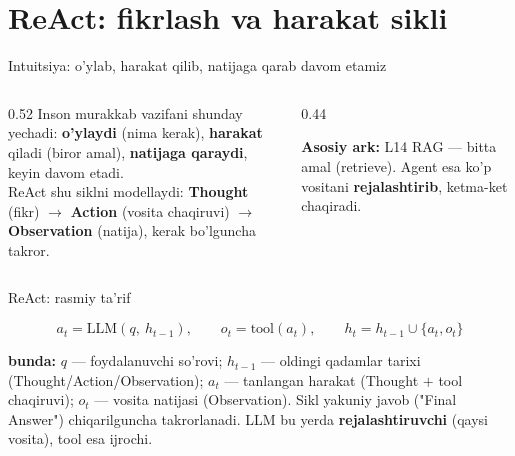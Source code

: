 \documentclass[aspectratio=169,11pt]{beamer}
\newcommand{\bunda}[1]{{\small\textbf{bunda:}\; #1}}
\begin{document}
\section[ReAct]{ReAct: fikrlash va harakat sikli}

\begin{frame}{Intuitsiya: o'ylab, harakat qilib, natijaga qarab davom etamiz}
  \begin{columns}[T]
    \begin{column}{0.52\textwidth}
      \small
      Inson murakkab vazifani shunday yechadi: \textbf{o'ylaydi} (nima kerak),
      \textbf{harakat} qiladi (biror amal), \textbf{natijaga qaraydi}, keyin
      davom etadi.\\[5pt]
      ReAct shu siklni modellaydi: \textbf{Thought} (fikr) $\to$ \textbf{Action}
      (vosita chaqiruvi) $\to$ \textbf{Observation} (natija), kerak bo'lguncha
      takror.
    \end{column}
    \begin{column}{0.44\textwidth}
      \begin{tcolorbox}[okbox,top=2pt,bottom=2pt]
        \footnotesize
        \textbf{Asosiy ark:} L14 RAG --- bitta amal (retrieve). Agent esa
        ko'p vositani \textbf{rejalashtirib}, ketma-ket chaqiradi.
      \end{tcolorbox}
    \end{column}
  \end{columns}
\end{frame}

\begin{frame}{ReAct: rasmiy ta'rif}
  \begin{tcolorbox}[defbox,title={Ta'rif: Reasoning + Acting sikli}]
    \vspace{-0.4em}
    $$ a_t = \mathrm{LLM}(q,\ h_{t-1}), \qquad
       o_t = \mathrm{tool}(a_t), \qquad
       h_t = h_{t-1} \cup \{a_t, o_t\} $$
  \end{tcolorbox}
  \vspace{2pt}
  \bunda{$q$ --- foydalanuvchi so'rovi; $h_{t-1}$ --- oldingi qadamlar tarixi
  (Thought/Action/Observation); $a_t$ --- tanlangan harakat (Thought $+$ tool
  chaqiruvi); $o_t$ --- vosita natijasi (Observation).}
  \vspace{4pt}
  \footnotesize Sikl yakuniy javob ("Final Answer") chiqarilguncha takrorlanadi.
  LLM bu yerda \textbf{rejalashtiruvchi} (qaysi vosita), tool esa ijrochi.
\end{frame}
\end{document}
